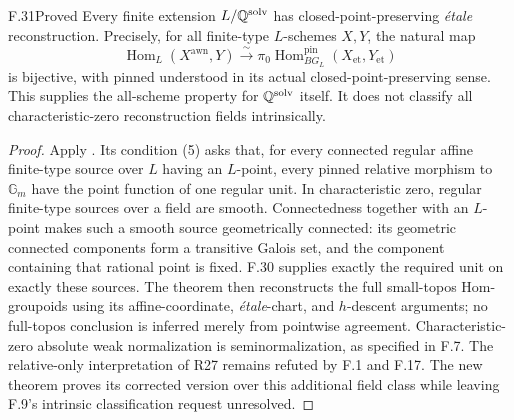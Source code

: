 \begin{claim}{F.31}{Proved}
Every finite extension $L/\mathbb Q^{\mathrm{solv}}$ has
closed-point-preserving \emph{\'etale} reconstruction. Precisely,
for all finite-type $L$-schemes $X,Y$, the natural map
\[
 \operatorname{Hom}_L(X^{\mathrm{awn}},Y)
 \xrightarrow{\sim}
 \pi_0\operatorname{Hom}^{\mathrm{pin}}_{BG_L}
       (X_{\mathrm{et}},Y_{\mathrm{et}})
\]
is bijective, with pinned understood in its actual
closed-point-preserving sense. This supplies the all-scheme
property for $\mathbb Q^{\mathrm{solv}}$ itself. It does not classify
all characteristic-zero reconstruction fields intrinsically.
\end{claim}
\begin{proof}
Apply \citet[Theorem~4.18, equivalence of (1) and (5)]{F_CHW2024}.
Its condition (5) asks that, for every connected regular affine
finite-type source over $L$ having an $L$-point, every pinned
relative morphism to $\mathbb G_m$ have the point function of
one regular unit. In characteristic zero, regular finite-type
sources over a field are smooth. Connectedness together with
an $L$-point makes such a smooth source geometrically connected:
its geometric connected components form a transitive Galois set,
and the component containing that rational point is fixed.
F.30 supplies exactly the required unit on exactly these sources.
The theorem then reconstructs the full small-topos Hom-groupoids
using its affine-coordinate, \emph{\'etale}-chart, and $h$-descent
arguments; no full-topos conclusion is inferred merely from
pointwise agreement. Characteristic-zero absolute weak
normalization is seminormalization, as specified in F.7.
The relative-only interpretation of R27 remains refuted by
F.1 and F.17. The new theorem proves its corrected version
over this additional field class while leaving F.9's intrinsic
classification request unresolved.
\end{proof}
